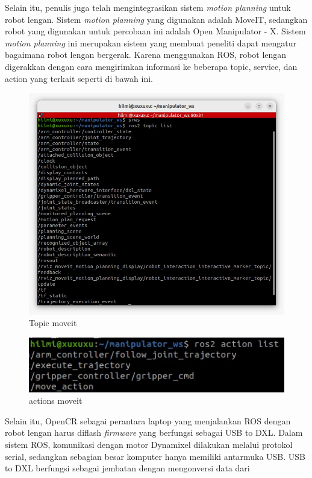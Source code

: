 Selain itu, penulis juga telah mengintegrasikan sistem \emph{motion planning} untuk robot lengan. Sistem \emph{motion planning} yang digunakan adalah MoveIT,
sedangkan robot yang digunakan untuk percobaan ini adalah Open Manipulator - X. Sistem \emph{motion planning} ini merupakan sistem yang membuat
peneliti dapat mengatur bagaimana robot lengan bergerak. Karena menggunakan ROS, robot lengan digerakkan dengan cara mengirimkan informasi
ke beberapa topic, service, dan action yang terkait seperti di bawah ini.
\begin{figure} [H] \centering
    \includegraphics[scale=0.3]{gambar/moveit topic.jpeg}
    \caption{Topic moveit}
    \label{fig:moveit_topic}
  \end{figure}
\begin{figure} [H] \centering
    \includegraphics[scale=0.4]{gambar/moveit actions.jpeg}
    \caption{actions moveit}
    \label{fig:moveit_actions}
\end{figure}
Selain itu, OpenCR sebagai perantara laptop yang menjalankan ROS dengan robot lengan harus diflash \emph{firmware} yang berfungsi sebagai
USB to DXL. Dalam sistem ROS, komunikasi dengan motor Dynamixel dilakukan melalui protokol serial,
sedangkan sebagian besar komputer hanya memiliki antarmuka USB. USB to DXL berfungsi sebagai jembatan dengan mengonversi data dari
